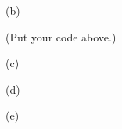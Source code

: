 
(b)
\begin{answercode}

\end{answercode}
(Put your code above.)


(c)
\begin{answercode}

\end{answercode}


(d)
\begin{answercode}

\end{answercode}

(e)
\begin{answercode}

\end{answercode}


